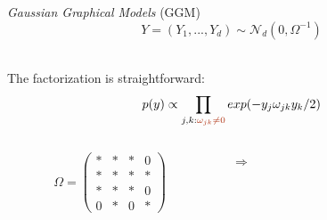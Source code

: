 \documentclass[11pt]{beamer}
\newcommand{\edgeunit}{1.5}
\newcommand{\emphase}[1]{\textcolor{Complement}{#1}}
\begin{document}
\begin{frame}{\textit{Gaussian Graphical Models} (GGM)}
 \vspace{-1cm}
 $$Y=(Y_1,...,Y_d) \sim \mathcal{N}_d(0,\Omega^{-1})$$\\
 \vspace{0.3cm}
 
 The factorization is straightforward:
$$p(y) \propto \prod_{j,k : \emphase{\omega_{jk} \neq 0 }} exp(-y_j \omega_{jk} y_k /2)  $$
\pause
\vspace{-1cm}
 \begin{columns} 
 \begin{column}{0.5\linewidth}

 \begin{flushright}
\[\Omega=
\left(
\begin{array}{*{4}{c}}
* & * & * & 0\\
*& * & * & *\\
* & * & * & 0\\
0 & * & 0 & *
\end{array}
\right)
\]
 \end{flushright}
 \end{column}
 \begin{column}{0.05\linewidth}
\begin{center}
 $\Rightarrow$
\end{center}
\end{column}
 \begin{column}{0.45\linewidth}
 \begin{flushleft}
\vspace{0.8cm}
 \\
\end{flushleft}
 \end{column}

\end{columns}
\end{frame}
\end{document}
